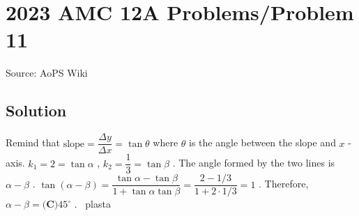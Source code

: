 \documentclass[12pt]{article}
\begin{document}
\section*{{2023 AMC 12A Problems/Problem 11}}
Source: AoPS Wiki

\subsection*{Solution}
Remind that $\text{slope}=\dfrac{\Delta y}{\Delta x}=\tan \theta$ where $\theta$ is the angle between the slope and $x$ -axis. $k_1=2=\tan \alpha$ , $k_2=\dfrac{1}{3}=\tan \beta$ . The angle formed by the two lines is $\alpha-\beta$ . $\tan(\alpha-\beta)=\dfrac{\tan\alpha-\tan\beta}{1+\tan\alpha\tan\beta}=\dfrac{2-1/3}{1+2\cdot 1/3}=1$ . Therefore, $\alpha-\beta=\boxed{\textbf{(C)} 45^\circ}$ . ~plasta
\end{document}
